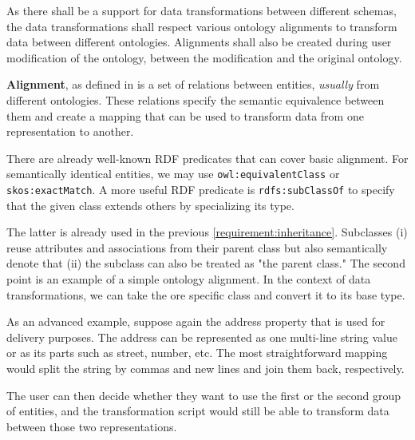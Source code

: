 \begin{requirement}
    As there shall be a support for data transformations between different schemas, the data transformations shall respect various ontology alignments to transform data between different ontologies. Alignments shall also be created during user modification of the ontology, between the modification and the original ontology.
    \label{requirement:ontology-alignments}
\end{requirement}

\textbf{Alignment}, as defined in \cite{euzenat_ontology_2013} is a set of relations between entities, \textit{usually} from different ontologies. These relations specify the semantic equivalence between them and create a mapping that can be used to transform data from one representation to another.

There are already well-known RDF predicates that can cover basic alignment. For semantically identical entities, we may use \verb|owl:equivalentClass| or \verb|skos:exactMatch|. A more useful RDF predicate is \verb|rdfs:subClassOf| to specify that the given class extends others by specializing its type.

The latter is already used in the previous \autoref{requirement:inheritance}. Subclasses (i) reuse attributes and associations from their parent class but also semantically denote that (ii) the subclass can also be treated as "the parent class." The second point is an example of a simple ontology alignment. In the context of data transformations, we can take the ore specific class and convert it to its base type.

\medskip

As an advanced example, suppose again the address property that is used for delivery purposes. The address can be represented as one multi-line string value or as its parts such as street, number, etc. The most straightforward mapping would split the string by commas and new lines and join them back, respectively.

The user can then decide whether they want to use the first or the second group of entities, and the transformation script would still be able to transform data between those two representations.

